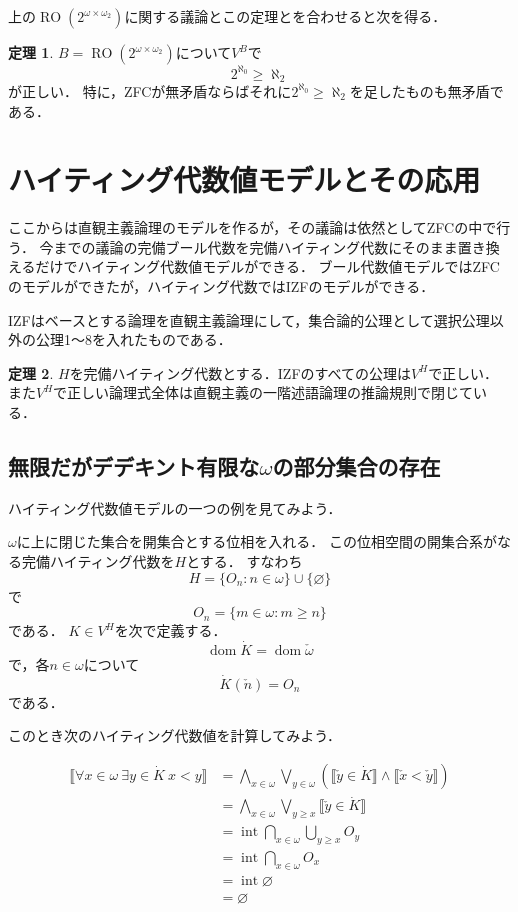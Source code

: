 \documentclass[uplatex,dvipdfmx]{jsarticle}
\newcommand{\dom}{\operatorname{dom}}
\newcommand{\intr}{\operatorname{int}}
\newcommand{\RO}{\operatorname{RO}}
\renewcommand\emptyset{\varnothing}
\newcommand{\truth}[1] {\llbracket #1 \rrbracket}
\theoremstyle{definition}
\newtheorem{thm}{定理}
\begin{document}
上の$\RO(2^{\omega \times \omega_2})$に関する議論とこの定理とを合わせると次を得る．

\begin{thm}
$B = \RO(2^{\omega \times \omega_2})$について$V^B$で
\[
2^{\aleph_0} \ge \aleph_2
\]
が正しい．
特に，ZFCが無矛盾ならばそれに$2^{\aleph_0} \ge \aleph_2$を足したものも無矛盾である．
\end{thm}

\section{ハイティング代数値モデルとその応用}
\label{sec:heyting}

ここからは直観主義論理のモデルを作るが，その議論は依然としてZFCの中で行う．
今までの議論の完備ブール代数を完備ハイティング代数にそのまま置き換えるだけでハイティング代数値モデルができる．
ブール代数値モデルではZFCのモデルができたが，ハイティング代数ではIZFのモデルができる．

IZFはベースとする論理を直観主義論理にして，集合論的公理として選択公理以外の公理1～8を入れたものである．

\begin{thm}
$H$を完備ハイティング代数とする．IZFのすべての公理は$V^H$で正しい．また$V^H$で正しい論理式全体は直観主義の一階述語論理の推論規則で閉じている．
\end{thm}

\subsection{無限だがデデキント有限な$\omega$の部分集合の存在}\label{infbutdedfin}

ハイティング代数値モデルの一つの例を見てみよう．

$\omega$に上に閉じた集合を開集合とする位相を入れる．
この位相空間の開集合系がなる完備ハイティング代数を$H$とする．
すなわち
\[
H = \{ O_n : n \in \omega \} \cup \{\emptyset\}
\]
で
\[
O_n = \{ m \in \omega : m \ge n \}
\]
である．
$K \in V^H$を次で定義する．
\[ \dom \dot{K} = \dom \check{\omega} \]
で，各$n \in \omega$について
\[ \dot{K}(\check{n}) = O_n \]
である．

このとき次のハイティング代数値を計算してみよう．

\begin{align*}
\truth{\forall x \in \omega\ \exists y \in \dot{K}\ x < y} &= \bigwedge_{x \in \omega} \bigvee_{y \in \omega} (\truth{\check{y} \in \dot{K}} \land \truth{\check{x} < \check{y}}) \\
 &= \bigwedge_{x \in \omega} \bigvee_{y \ge x} \truth{\check{y} \in \dot{K}} \\
 &= \intr \bigcap_{x \in \omega} \bigcup_{y \ge x} O_y \\
 &= \intr \bigcap_{x \in \omega} O_x \\
 &= \intr \emptyset \\
 &= \emptyset
\end{align*}
\end{document}
